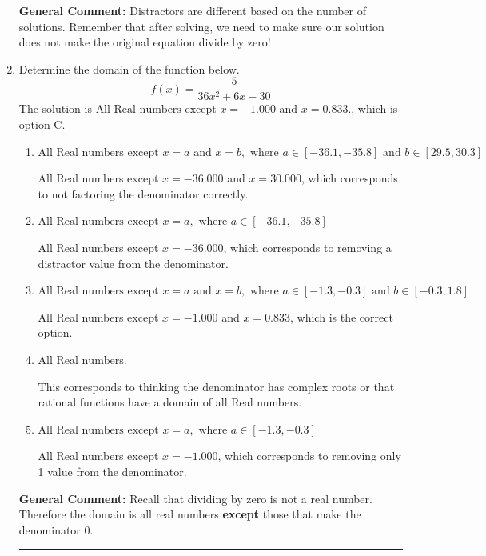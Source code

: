 \documentclass{extbook}[14pt]
\newcommand{\litem}[1]{\item #1

\rule{\textwidth}{0.4pt}}
\begin{document}
\begin{enumerate}
{\textbf{General Comment:} Distractors are different based on the number of solutions. Remember that after solving, we need to make sure our solution does not make the original equation divide by zero!
}
\litem{
Determine the domain of the function below.
\[ f(x) = \frac{5}{36x^{2} +6 x -30} \]The solution is \( \text{All Real numbers except } x = -1.000 \text{ and } x = 0.833. \), which is option C.\begin{enumerate}[label=\Alph*.]
\item \( \text{All Real numbers except } x = a \text{ and } x = b, \text{ where } a \in [-36.1, -35.8] \text{ and } b \in [29.5, 30.3] \)

All Real numbers except $x = -36.000$ and $x = 30.000$, which corresponds to not factoring the denominator correctly.
\item \( \text{All Real numbers except } x = a, \text{ where } a \in [-36.1, -35.8] \)

All Real numbers except $x = -36.000$, which corresponds to removing a distractor value from the denominator.
\item \( \text{All Real numbers except } x = a \text{ and } x = b, \text{ where } a \in [-1.3, -0.3] \text{ and } b \in [-0.3, 1.8] \)

All Real numbers except $x = -1.000$ and $x = 0.833$, which is the correct option.
\item \( \text{All Real numbers.} \)

This corresponds to thinking the denominator has complex roots or that rational functions have a domain of all Real numbers.
\item \( \text{All Real numbers except } x = a, \text{ where } a \in [-1.3, -0.3] \)

All Real numbers except $x = -1.000$, which corresponds to removing only 1 value from the denominator.
\end{enumerate}

\textbf{General Comment:} Recall that dividing by zero is not a real number. Therefore the domain is all real numbers \textbf{except} those that make the denominator 0.
}
\end{enumerate}
\end{document}
